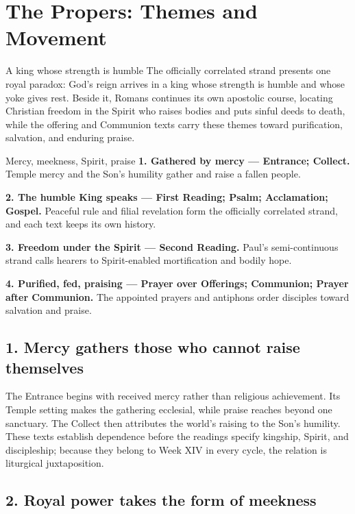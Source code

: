 \section*{The Propers: Themes and Movement}

\begin{massbox}{A king whose strength is humble}
The officially correlated strand presents one royal paradox: God's reign arrives in a king whose strength is humble and whose yoke gives rest. Beside it, Romans continues its own apostolic course, locating Christian freedom in the Spirit who raises bodies and puts sinful deeds to death, while the offering and Communion texts carry these themes toward purification, salvation, and enduring praise.
\end{massbox}

\begin{studybox}{Mercy, meekness, Spirit, praise}
\textbf{1. Gathered by mercy --- Entrance; Collect.} Temple mercy and the Son's humility gather and raise a fallen people.\par\smallskip
\textbf{2. The humble King speaks --- First Reading; Psalm; Acclamation; Gospel.} Peaceful rule and filial revelation form the officially correlated strand, and each text keeps its own history.\par\smallskip
\textbf{3. Freedom under the Spirit --- Second Reading.} Paul's semi-continuous strand calls hearers to Spirit-enabled mortification and bodily hope.\par\smallskip
\textbf{4. Purified, fed, praising --- Prayer over Offerings; Communion; Prayer after Communion.} The appointed prayers and antiphons order disciples toward salvation and praise.
\end{studybox}

\subsection*{1. Mercy gathers those who cannot raise themselves\enspace{}}

The Entrance begins with received mercy rather than religious achievement. Its Temple setting makes the gathering ecclesial, while praise reaches beyond one sanctuary. The Collect then attributes the world's raising to the Son's humility. These texts establish dependence before the readings specify kingship, Spirit, and discipleship; because they belong to Week XIV in every cycle, the relation is liturgical juxtaposition.

\subsection*{2. Royal power takes the form of meekness\enspace{}}

